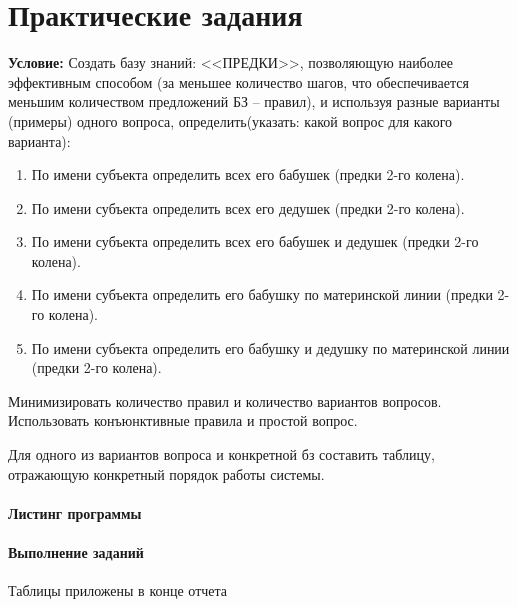 \chapter{Практические задания}

\textbf{Условие:} Создать базу знаний: <<ПРЕДКИ>>, позволяющую наиболее эффективным способом (за меньшее количество шагов, что обеспечивается меньшим количеством предложений БЗ -- правил), и используя  разные  варианты  (примеры) одного вопроса, определить(указать: какой вопрос для какого варианта):

\begin{enumerate}
	\item По имени субъекта определить всех его бабушек (предки 2-го колена).
	\item По имени субъекта определить всех его дедушек (предки 2-го колена).
	\item По  имени  субъекта  определить всех его  бабушек  и  дедушек  (предки  2-го колена).
	\item По имени субъекта определить его бабушку по материнской линии (предки 2-го колена).
	\item По имени субъекта определить его бабушку и дедушку по материнской линии (предки 2-го колена).
\end{enumerate}

Минимизировать количество правил и количество вариантов вопросов. Использовать конъюнктивные правила и простой вопрос. 

Для одного из вариантов вопроса и  конкретной бз составить  таблицу, отражающую конкретный порядок работы системы.

\subsubsection{Листинг программы}




\subsubsection{Выполнение заданий}

Таблицы приложены в конце отчета
